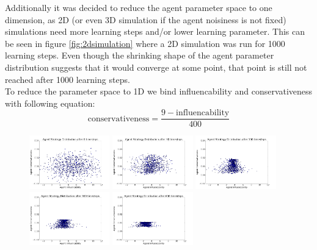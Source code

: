 \documentclass[11pt]{article}
\begin{document}
Additionally it was decided to reduce the agent parameter space to one dimension, as 2D (or even 3D simulation if the agent noisiness is not fixed) simulations need more learning steps and/or lower learning parameter. This can be seen in figure \ref{fig:2dsimulation} where a 2D simulation was run for 1000 learning steps. Even though the shrinking shape of the agent parameter distribution suggests that it would converge at some point, that point is still not reached after 1000 learning steps. \\
To reduce the parameter space to 1D we bind influencability and conservativeness with following equation: 
\begin{equation}
  \text{conservativeness} = \frac{9 - \text{influencability}}{400}
\end{equation}
\begin{figure}
  \centering
  \quad
  \includegraphics[width=0.31\textwidth]{figures/2dsim_1.png}
  \includegraphics[width=0.31\textwidth]{figures/2dsim_2.png}
  \includegraphics[width=0.31\textwidth]{figures/2dsim_3.png}
  \includegraphics[width=0.31\textwidth]{figures/2dsim_4.png}
  \includegraphics[width=0.31\textwidth]{figures/2dsim_5.png}

\end{figure}
\end{document}
